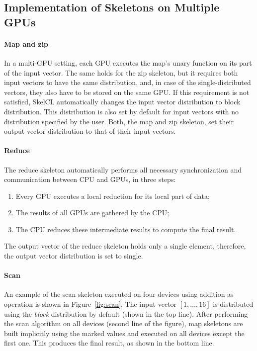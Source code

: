 \subsection{Implementation of Skeletons on Multiple GPUs}

\paragraph{Map and zip}
In a multi-GPU setting, each GPU executes the map's unary function on its part of the input vector.
The same holds for the zip skeleton, but it requires both input vectors to have the same distribution, and, in case of the single-distributed vectors, they also have to be stored on the same GPU.
If this requirement is not satisfied, SkelCL automatically changes the input vector distribution to block distribution.
This distribution is also set by default for input vectors with no distribution specified by the user.
Both, the map and zip skeleton, set their output vector distribution to that of their input vectors.

\paragraph{Reduce}
The reduce skeleton automatically performs all necessary synchronization and communication between CPU and GPUs, in three steps:
\begin{enumerate}
 \item Every GPU executes a local reduction for its local part of data;
 \item The results of all GPUs are gathered by the CPU;
 \item The CPU reduces these intermediate results to compute the final result.
\end{enumerate}
The output vector of the reduce skeleton holds only a single element, therefore, the output vector distribution is set to single.

\paragraph{Scan}
An example of the scan skeleton executed on four devices using addition as operation is shown in Figure~\ref{fig:scan}.
The input vector $[1,\ldots,16]$ is distributed using the \emph{block} distribution by default (shown in the top line).
After performing the scan algorithm on all devices (second line of the figure), map skeletons are built implicitly using the marked values and executed on all devices except the first one.
This produces the final result, as shown in the bottom line.

